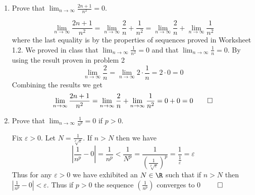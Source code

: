 \documentclass[11pt]{exam}
\begin{document}
\begin{enumerate}
        \item Prove that $\lim_{n \to \infty} \frac{2n+1}{n^2} = 0$.
            \begin{solution}
                $$
                \lim_{n \to \infty} \frac{2n+1}{n^2} = \lim_{n \to \infty} \frac{2}{n} + \frac{1}{n^2} = \lim_{n \to \infty} \frac{2}{n} + \lim_{n \to \infty} \frac{1}{n^2}
                $$
                where the last equality is by the properties of sequences proved in Worksheet 1.2. We proved in class that $\lim_{n \to \infty} \frac{1}{n^2} = 0$ and that $\lim_{n \to \infty} \frac{1}{n} = 0$. By using the result proven in problem 2 $$\lim_{n \to \infty} \frac{2}{n} = \lim_{n \to \infty} 2 \cdot \frac{1}{n} = 2 \cdot 0 = 0$$ 
                Combining the results we get 
                $$ 
                \lim_{n \to \infty} \frac{2n+1}{n^2} = \lim_{n \to \infty} \frac{2}{n} + \lim_{n \to \infty} \frac{1}{n^2} = 0 + 0 = 0 \hspace*{0em plus 1fill} \qed
                $$

            \end{solution}

        \item Prove that $\lim_{n \to \infty} \frac{1}{n^p} = 0$ if $p > 0$.
            \begin{solution}
                Fix $\varepsilon > 0$. Let $N = \frac{1}{\sqrt[p]{\varepsilon}}$. If $n > N$ then we have 
                $$
                \left|\frac{1}{n^p} - 0 \right| = \frac{1}{n^p} < \frac{1}{N^p} = 
                \frac{1}{\left(\frac{1}{\sqrt[p]{\varepsilon}}\right)^p} = \frac{1}{\frac{1}{\varepsilon}} = \varepsilon
                $$
                Thus for any $\varepsilon > 0$ we have exhibited an $N \in \R$ such that if $n > N$ then $\left|\frac{1}{n^p} - 0 \right| < \varepsilon$. Thus if $p > 0$ the sequence $\left(\frac{1}{n^p}\right)$  converges to 0 $\hspace*{0em plus 1fill} \qed$

            \end{solution}

    \end{enumerate}
\end{document}
